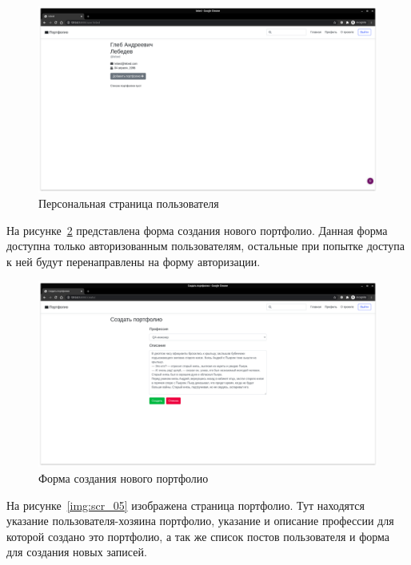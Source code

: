 \begin{figure}[H]
    \centering
    \includegraphics[scale=0.235]{images/scr_03.png}
    \caption{Персональная страница пользователя}\label{img:scr_03}
\end{figure}

На рисунке~\ref{img:scr_04} представлена форма создания нового портфолио. Данная форма доступна только авторизованным пользователям, остальные при попытке доступа к ней будут перенаправлены на форму авторизации.

\begin{figure}[H]
    \centering
    \includegraphics[scale=0.235]{images/scr_04.png}
    \caption{Форма создания нового портфолио}\label{img:scr_04}
\end{figure}

На рисунке~\ref{img:scr_05} изображена страница портфолио. Тут находятся указание пользователя-хозяина портфолио, указание и описание профессии для которой создано это портфолио, а так же список постов пользователя и форма для создания новых записей.

